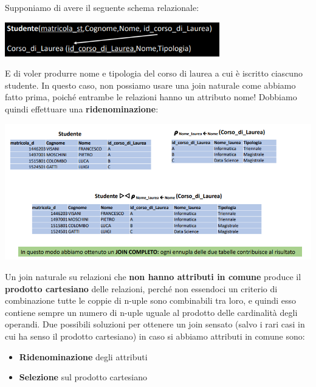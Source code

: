 \documentclass[12pt]{article}
\begin{document}
Supponiamo di avere il seguente schema relazionale:
\begin{center}
    \includegraphics[width =0.70\textwidth]{Images/143.PNG}
\end{center}
E di voler produrre nome e tipologia del corso di laurea a cui è iscritto ciascuno studente.
In questo caso, non possiamo usare una join naturale come abbiamo fatto prima, poiché entrambe le relazioni hanno un attributo nome!
Dobbiamo quindi effettuare una \textbf{ridenominazione}:
\begin{center}
    \includegraphics[width =1.10\textwidth]{Images/144.PNG}
\end{center} 
Un join naturale su relazioni che \textbf{non hanno attributi in comune} produce il \textbf{prodotto cartesiano} delle relazioni, perché non essendoci un criterio di combinazione tutte le coppie di n-uple sono combinabili tra loro, e quindi esso contiene sempre un numero di n-uple uguale al prodotto delle cardinalità degli operandi.
Due possibili soluzioni per ottenere un join sensato (salvo i rari casi in cui ha senso il prodotto cartesiano) in caso si abbiamo attributi in comune sono:
\begin{itemize}
    \item \textbf{Ridenominazione} degli attributi
    \item \textbf{Selezione} sul prodotto cartesiano
\end{itemize}
\end{document}
